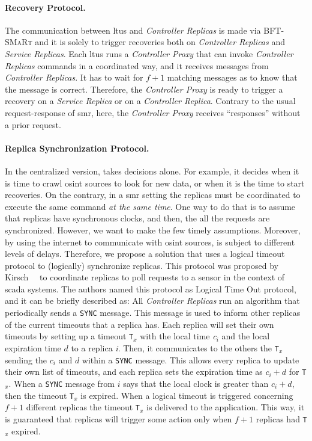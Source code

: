  
\paragraph{Recovery Protocol.}
The communication between \glspl{ltu} and \emph{Controller Replicas} is made via \textsc{BFT-SMaRt} and it is solely to trigger recoveries both on \emph{Controller Replicas} and \emph{Service Replicas}.
Each \glspl{ltu} runs a \emph{Controller Proxy} that can invoke \emph{Controller Replicas} commands in a coordinated way, and it receives messages from \emph{Controller Replicas}.
It has to wait for $f+1$ matching messages as to know that the message is correct. 
Therefore, the \emph{Controller Proxy} is ready to trigger a recovery on a \emph{Service Replica} or on a \emph{Controller Replica}.
Contrary to the usual request-response of \gls{smr}, here, the \emph{Controller Proxy} receives ``responses'' without a prior request. 


\paragraph{Replica Synchronization Protocol.}
In the centralized version, \system takes decisions alone.
For example, it decides when it is time to crawl \gls{osint} sources to look for new data, or when it is the time to start recoveries.
On the contrary, in a \gls{smr} setting the replicas must be coordinated to execute the same command \emph{at the same time}.
One way to do that is to assume that replicas have synchronous clocks, and then, the all the requests are synchronized.
However, we want to make the few timely assumptions.
Moreover, by using the internet to communicate with \gls{osint} sources, \system is subject to different levels of delays.
Therefore, we propose a solution that uses a logical timeout protocol to (logically) synchronize replicas.
This protocol was proposed by Kirsch~\etal{}~\cite{Kirsch:2014} to coordinate replicas to poll requests to a sensor in the context of \gls{scada} systems.
The authors named this protocol as Logical Time Out protocol, and it can be briefly described as:
All \emph{Controller Replicas} run an algorithm that periodically sends a \texttt{SYNC} message.
This message is used to inform other replicas of the current timeouts that a replica has.
Each replica will set their own timeouts by setting up a timeout \texttt{T$_x$} with the local time \emph{c$_i$} and the local expiration time \emph{$d$} to a replica \emph{i}.
Then, it communicates to the others the \texttt{T$_x$} sending the \emph{$c_i$} and \emph{$d$} within a \texttt{SYNC} message.
This allows every replica to update their own list of timeouts, and each replica sets the expiration time as \emph{$c_i + d$} for \texttt{T$_x$}.
When a \texttt{SYNC} message from $i$ says that the local clock is greater than \emph{$c_i + d$}, then the timeout \texttt{T$_x$} is expired.
When a logical timeout is triggered concerning $f+1$ different replicas the timeout \texttt{T$_x$} is delivered to the application.
This way, it is guaranteed that replicas will trigger some action only when $f+1$ replicas had \texttt{T$_x$} expired.
 


